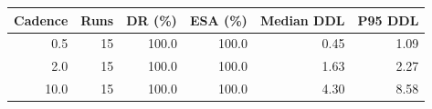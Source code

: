 \begin{tabular}{@{}rrrrrr@{}}
\toprule
Cadence & Runs & DR (\%) & ESA (\%) & Median DDL & P95 DDL \\
\midrule
0.5 & 15 & 100.0 & 100.0 & 0.45 & 1.09 \\
2.0 & 15 & 100.0 & 100.0 & 1.63 & 2.27 \\
10.0 & 15 & 100.0 & 100.0 & 4.30 & 8.58 \\
\bottomrule
\end{tabular}
